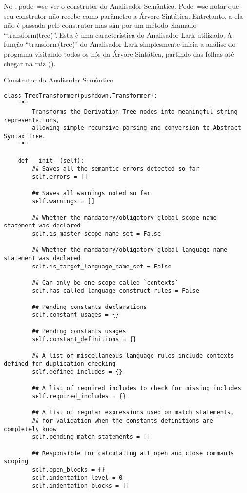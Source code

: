 No ,
pode~=se ver o construtor do Analisador Semântico.
Pode~=se notar que seu construtor não recebe como parãmetro a Árvore Sintática.
Entretanto,
a ela não é passada pelo construtor mas sim por um método chamado ``transform(tree)''.
Esta é uma característica do Analisador Lark utilizado.
A função ``transform(tree)'' do Analisador Lark simplesmente inicia a análise do programa visitando todos os nós da Árvore Sintática,
partindo das folhas até chegar na raíz ().
\begin{code}
\caption{Construtor do Analisador Semântico}
\label{semanticAnalizerConstructor}
\begin{verbatim}
class TreeTransformer(pushdown.Transformer):
    """
        Transforms the Derivation Tree nodes into meaningful string representations,
        allowing simple recursive parsing and conversion to Abstract Syntax Tree.
    """

    def __init__(self):
        ## Saves all the semantic errors detected so far
        self.errors = []

        ## Saves all warnings noted so far
        self.warnings = []

        ## Whether the mandatory/obligatory global scope name statement was declared
        self.is_master_scope_name_set = False

        ## Whether the mandatory/obligatory global language name statement was declared
        self.is_target_language_name_set = False

        ## Can only be one scope called `contexts`
        self.has_called_language_construct_rules = False

        ## Pending constants declarations
        self.constant_usages = {}

        ## Pending constants usages
        self.constant_definitions = {}

        ## A list of miscellaneous_language_rules include contexts defined for duplication checking
        self.defined_includes = {}

        ## A list of required includes to check for missing includes
        self.required_includes = {}

        ## A list of regular expressions used on match statements,
        ## for validation when the constants definitions are completely know
        self.pending_match_statements = []

        ## Responsible for calculating all open and close commands scoping
        self.open_blocks = {}
        self.indentation_level = 0
        self.indentation_blocks = []
\end{verbatim}
\end{code}


